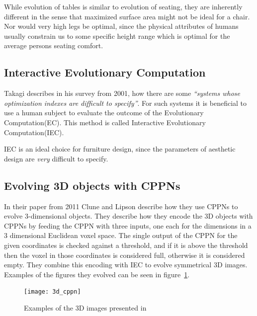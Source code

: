 While evolution of tables is similar to evolution of seating, they are
inherently different in the sense that maximized surface area might not be ideal
for a chair. Nor would very high legs be optimal, since the physical
attributes of humans usually constrain us to some specific height range which is
optimal for the average persons seating comfort.

\subsection{Interactive Evolutionary Computation}
Takagi describes in his survey from 2001\cite{Takagi2001}, how there are some 
\emph{``systems whose optimization indexes are difficult to 
specify''}\cite[p.~1275]{Takagi2001}.
For such systems it is beneficial to use a human subject to evaluate the outcome
of the Evolutionary Computation(EC). This method is called Interactive
Evolutionary Computation(IEC).

IEC is an ideal choice for furniture design, since the parameters of aesthetic
design are \emph{very} difficult to specify.

\subsection{Evolving 3D objects with CPPNs}
In their paper from 2011 Clune and Lipson describe how they use CPPNs to evolve 
3-dimensional objects\cite{Clune:2011:EOG:2078245.2078246}.
They describe how they encode the 3D objects with CPPNs by feeding the CPPN 
with three inputs, one each for the dimensions in a 3 dimensional Euclidean
voxel space.
The single output of the CPPN for the given coordinates is checked against a
threshold, and if it is above the threshold then the voxel in those coordinates
is considered full, otherwise it is considered
empty\cite[p.~5]{Clune:2011:EOG:2078245.2078246}. They combine this encoding
with IEC to evolve symmetrical 3D images. Examples of the figures they evolved
can be seen in figure~\ref{fig:3dobjects}.
\begin{figure}[ht]
\centering
\texttt{[image: 3d\_cppn]}
\caption{Examples of the 3D images presented in 
\cite{Clune:2011:EOG:2078245.2078246}}
\label{fig:3dobjects}
\end{figure}

